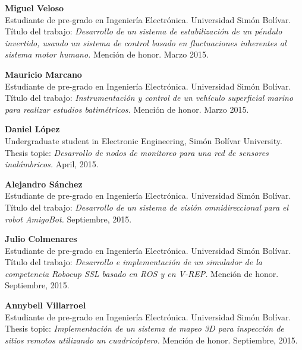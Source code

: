 \documentclass[10pt]{article}
\begin{document}
\begin{bibsection}
    \item \textbf{Miguel Veloso}\\
        Estudiante de pre-grado en Ingeniería Electrónica. Universidad Simón Bolívar. \\
        Título del trabajo: \textit{Desarrollo de un sistema de estabilización
          de un péndulo invertido,
          usando un sistema de control basado en fluctuaciones inherentes al
          sistema motor humano.}
        Mención de honor. Marzo 2015.

    \item \textbf{Mauricio Marcano}\\
        Estudiante de pre-grado en Ingeniería Electrónica. Universidad Simón Bolívar. \\
        Título del trabajo: \textit{Instrumentación y control de un vehículo
          superficial
          marino para realizar estudios batimétricos.} Mención de honor. Marzo 2015.

    \item \textbf{Daniel López}\\
        Undergraduate student in Electronic Engineering, Simón Bolívar University.\\
        Thesis topic: \textit{Desarrollo de nodos de monitoreo para una red de
          sensores inalámbricos.} April, 2015.

    \item \textbf{Alejandro Sánchez}\\
        Estudiante de pre-grado en Ingeniería Electrónica. Universidad Simón Bolívar. \\
        Título del trabajo: \textit{Desarrollo de un sistema de visión
          omnidireccional para
          el robot AmigoBot.} Septiembre, 2015.

    \item \textbf{Julio Colmenares}\\
        Estudiante de pre-grado en Ingeniería Electrónica. Universidad Simón Bolívar. \\
        Título del trabajo: \textit{Desarrollo e implementación de un simulador
          de la competencia Robocup SSL basado en ROS y en V-REP.} Mención de honor. Septiembre, 2015.

     \item \textbf{Annybell Villarroel}\\
        Estudiante de pre-grado en Ingeniería Electrónica. Universidad Simón Bolívar. \\
        Thesis topic: \textit{Implementación de un sistema de mapeo 3D para
          inspección de sitios remotos utilizando un cuadricóptero.} Mención de
        honor. Septiembre, 2015.


\end{bibsection}
\end{document}
